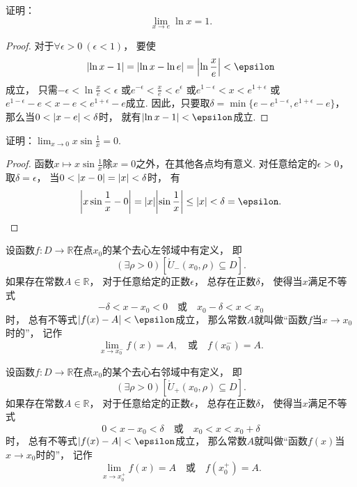 \begin{example}
证明：\begin{equation}\label{equation:函数极限.重要极限13}
	\lim_{x \to e} \ln x = 1.
\end{equation}
\begin{proof}
对于\(\forall\epsilon>0\ (\epsilon<1)\)，
要使\[
	\abs{\ln x - 1}
	= \abs{\ln x - \ln e}
	= \abs{\ln\frac{x}{e}}
	< \epsilon
\]成立，
只需\(-\epsilon < \ln\frac{x}{e} < \epsilon\)
或\(e^{-\epsilon} < \frac{x}{e} < e^\epsilon\)
或\(e^{1-\epsilon} < x < e^{1+\epsilon}\)
或\(e^{1-\epsilon}-e < x-e < e^{1+\epsilon}-e\)成立.
因此，只要取\(\delta = \min\{
	e-e^{1-\epsilon},
	e^{1+\epsilon}-e
\}\)，
那么当\(0<\abs{x-e}<\delta\)时，
就有\(\abs{\ln x-1}<\epsilon\)成立.
\end{proof}
\end{example}

\begin{example}
证明：\(\lim_{x\to0} x \sin\frac1x = 0\).
\begin{proof}
函数\(x \mapsto x \sin\frac1x\)除\(x=0\)之外，在其他各点均有意义.
对任意给定的\(\epsilon>0\)，
取\(\delta=\epsilon\)，
当\(0<\abs{x-0}=\abs{x}<\delta\)时，
有\[
	\abs{x \sin\frac1x - 0}
	= \abs{x} \abs{\sin\frac1x}
	\leq \abs{x}
	< \delta = \epsilon.
	\qedhere
\]
\end{proof}
\end{example}

\begin{definition}\label{definition:极限.函数极限的定义2}
设函数\(f\colon D\to\mathbb{R}\)在点\(x_0\)的某个去心左邻域中有定义，
即\[
	(\exists\rho>0)
	[\mathring{U}_-(x_0,\rho) \subseteq D].
\]
如果存在常数\(A\in\mathbb{R}\)，
对于任意给定的正数\(\epsilon\)，
总存在正数\(\delta\)，
使得当\(x\)满足不等式\[
	-\delta < x - x_0 < 0
	\quad\text{或}\quad
	x_0 - \delta < x < x_0
\]时，
总有不等式\(\abs{f(x) - A} < \epsilon\)成立，
那么常数\(A\)就叫做“函数\(f\)当\(x \to x_0\)时的”，
记作\[
	\lim_{x \to x_0^-} f(x) = A,
	\quad\text{或}\quad
	f(x_0^-) = A.
\]
\end{definition}

\begin{definition}\label{definition:极限.函数极限的定义3}
设函数\(f\colon D\to\mathbb{R}\)在点\(x_0\)的某个去心右邻域中有定义，
即\[
	(\exists\rho>0)
	[\mathring{U}_+(x_0,\rho) \subseteq D].
\]
如果存在常数\(A\in\mathbb{R}\)，
对于任意给定的正数\(\epsilon\)，
总存在正数\(\delta\)，
使得当\(x\)满足不等式\[
	0 < x - x_0 < \delta
	\quad\text{或}\quad
	x_0 < x < x_0 + \delta
\]时，
总有不等式\(\abs{f(x) - A} < \epsilon\)成立，
那么常数\(A\)就叫做“函数\(f(x)\)当\(x \to x_0\)时的”，
记作\[
	\lim_{x \to x_0^+} f(x) = A
	\quad\text{或}\quad
	f(x_0^+) = A.
\]
\end{definition}

